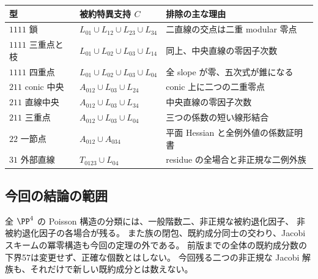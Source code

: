 \begin{center}\small
\begin{tabular}{@{}p{23mm}p{64mm}p{47mm}@{}}\toprule
型 & 被約特異支持 $C$ & 排除の主な理由\\\midrule
$1111$ 鎖 & $L_{01}\cup L_{12}\cup L_{23}\cup L_{34}$ & 二直線の交点は二重 modular 零点\\
$1111$ 三重点と枝 & $L_{01}\cup L_{02}\cup L_{03}\cup L_{14}$ & 同上、中央直線の零因子次数\\
$1111$ 四重点 & $L_{01}\cup L_{02}\cup L_{03}\cup L_{04}$ & 全 slope が零、五次式が錐になる\\
$211$ conic 中央 & $A_{012}\cup L_{03}\cup L_{24}$ & conic 上に二つの二重零点\\
$211$ 直線中央 & $A_{012}\cup L_{03}\cup L_{34}$ & 中央直線の零因子次数\\
$211$ 三重点 & $A_{012}\cup L_{03}\cup L_{04}$ & 三つの係数の短い線形結合\\
$22$ 一節点 & $A_{012}\cup A_{034}$ & 平面 Hessian と全例外値の係数証明書\\
$31$ 外部直線 & $T_{0123}\cup L_{04}$ & residue の全場合と非正規な二例外族\\\bottomrule
\end{tabular}\end{center}

\subsection{今回の結論の範囲}
全 $\PP^4$ の Poisson 構造の分類には、一般階数二、非正規な被約退化因子、
非被約退化因子の各場合が残る。
また族の閉包、既約成分同士の交わり、Jacobi スキームの冪零構造も今回の定理の外である。
前版までの全体の既約成分数の下界57は変更せず、正確な個数とはしない。
今回残る二つの非正規な Jacobi 解族も、それだけで新しい既約成分とは数えない。
